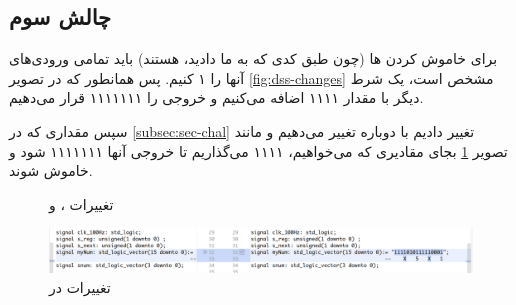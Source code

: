 \documentclass[dvipsnames, svgnames, x11names, a4paper, 11pt]{article}
\begin{document}
\subsection{چالش سوم}
برای خاموش کردن 
ها
(چون طبق کدی که به ما دادید،  هستند) باید تمامی ورودی‌های آنها را ۱ کنیم. پس همانطور که در تصویر 
\ref{fig:dss-changes}
مشخص است، یک شرط دیگر با مقدار ۱۱۱۱ اضافه می‌کنیم و خروجی را ۱۱۱۱۱۱۱ قرار می‌دهیم.

سپس مقداری که در 
\ref{subsec:sec-chal}
تغییر دادیم با دوباره تغییر می‌دهیم و مانند تصویر
\ref{fig:sseg-changes}
بجای مقادیری که می‌خواهیم، ۱۱۱۱ می‌گذاریم تا خروجی آنها ۱۱۱۱۱۱۱ شود و خاموش شوند.
\begin{figure}[b]
\begin{center}
\hspace{3mm}
\hspace{3mm}
\end{center}
\caption{تغییرات ،  و }
\end{figure}

\begin{figure}[b]
\begin{center}
\includegraphics[width=0.90\textheight, height=0.148\textwidth, angle=90]{./images/sseg-changes}
\end{center}
\caption{تغییرات در }
\label{fig:sseg-changes}
\end{figure}
\listoffigures
\end{document}
